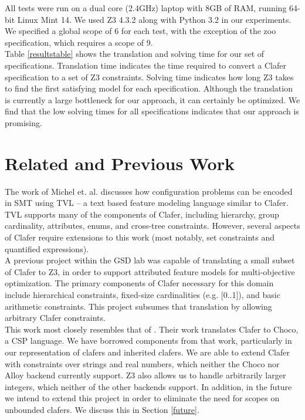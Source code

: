 \documentclass{easychair}
\begin{document}
\indent All tests were run on a dual core (2.4GHz) laptop with 8GB of RAM, running 64-bit Linux Mint 14. We used Z3 4.3.2 along with Python 3.2 in our experiments. We specified a global scope of 6 for each test, with the exception of the zoo specification, which requires a scope of 9. \\
\indent Table \ref{resultstable} shows the translation and solving time for our set of specifications. Translation time indicates the time required to convert a Clafer specification to a set of Z3 constraints. Solving time indicates how long Z3 takes to find the first satisfying model for each specification. Although the translation is currently a large bottleneck for our approach, it can certainly be optimized. We find that the low solving times for all specifications indicates that our approach is promising.

\section{Related and Previous Work}
\indent The work of Michel et. al. \cite{Michel2012} discusses how configuration problems can be encoded in SMT using TVL \cite{Classen2011} -- a text based feature modeling language similar to Clafer. TVL supports many of the components of Clafer, including hierarchy, group cardinality, attributes, enums, and cross-tree constraints. However, several aspects of Clafer require extensions to this work (most notably, set constraints and quantified expressions). \\
\indent  A previous project \cite{Olaechea2013} within the GSD lab was capable of translating a small subset of Clafer to Z3, in order to support attributed feature models for multi-objective optimization. The primary components of Clafer necessary for this domain include hierarchical constraints, fixed-size cardinalities (e.g. [0..1]), and basic arithmetic constraints. This project subsumes that translation by allowing arbitrary Clafer constraints.\\
\indent This work most closely resembles that of \cite{Liang}. Their work translates Clafer to Choco, a CSP language. We have borrowed components from that work, particularly in our representation of clafers and inherited clafers. We are able to extend Clafer with constraints over strings and real numbers, which neither the Choco nor Alloy backend currently support. Z3 also allows us to handle arbitrarily larger integers, which neither of the other backends support. In addition, in the future we intend to extend this project in order to eliminate the need for scopes on unbounded clafers. We discuss this in Section \ref{future}. 
\end{document}
